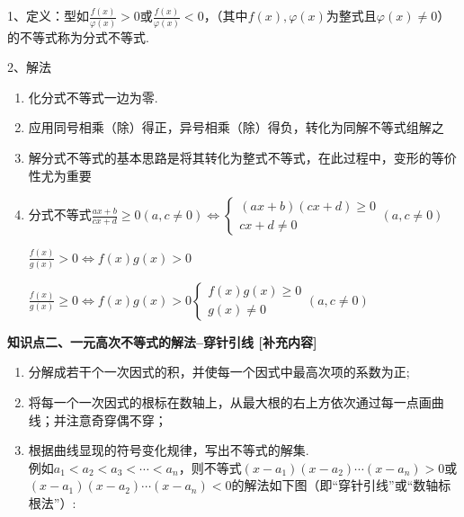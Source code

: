 \documentclass[11pt,a4paper]{ctexbook}
\begin{document}
1、定义：型如$\displaystyle \frac{f(x)}{\varphi(x)}>0$或$\displaystyle \frac{f(x)}{\varphi(x)}<0$，（其中$f(x),\varphi(x)$为整式且$\varphi(x)\ne 0$）的不等式称为分式不等式.\par
2、解法\par
\begin{enumerate}
    \item 化分式不等式一边为零.
    \item 应用同号相乘（除）得正，异号相乘（除）得负，转化为同解不等式组解之
    \item 解分式不等式的基本思路是将其转化为整式不等式，在此过程中，变形的等价性尤为重要
    \item 分式不等式$\displaystyle \frac{ax+b}{cx+d}\ge 0(a,c \ne 0) \Leftrightarrow
    \left\{
        \begin{aligned}
        (ax+b)(cx+d)\ge 0 \\
        cx+d \ne 0 
        \end{aligned}
        \right. 
        (a,c \ne 0) 
    $\par
    $\displaystyle \frac{f(x)}{g(x)}> 0 \Leftrightarrow f(x)g(x)>0 $\par
    $\displaystyle \frac{f(x)}{g(x)}\ge 0 \Leftrightarrow f(x)g(x)>0
    \left\{
        \begin{aligned}
            f(x)g(x)\ge 0 \\
            g(x) \ne 0 
        \end{aligned}
        (a,c \ne 0)
        \right.  
    $\par

\end{enumerate}
\begin{formal}
    {\large \textbf{知识点二、一元高次不等式的解法--穿针引线 [补充内容]}}
\end{formal}

\begin{enumerate}
    \item 分解成若干个一次因式的积，并使每一个因式中最高次项的系数为正;
    \item 将每一个一次因式的根标在数轴上，从最大根的右上方依次通过每一点画曲线；并注意奇穿偶不穿；
    \item 根据曲线显现的符号变化规律，写出不等式的解集.\\ 
    例如$a_1<a_2<a_3<\cdots <a_n$，则不等式$(x-a_1)(x-a_2)\cdots(x-a_n)>0$或$(x-a_1)(x-a_2)\cdots(x-a_n)<0$的解法如下图（即“穿针引线”或“数轴标根法”）:\par
    \begin{center}
\end{center}

\end{enumerate}
\end{document}

